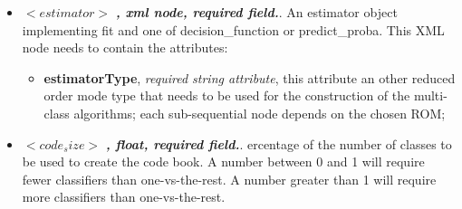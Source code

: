 \begin{itemize}
\item $<estimator>$ \textbf{\textit{, xml node, required field.}}.  An estimator object implementing fit and one of decision\_function or predict\_proba.  This XML node needs to contain the attributes:
\vspace{-5mm}
\begin{itemize}
\itemsep0em
\item \textbf{estimatorType}, \textit{required string attribute}, this attribute an other reduced order mode type that needs to be used for the construction of the multi-class algorithms; each sub-sequential node depends on the chosen ROM;
\end{itemize}
\item $<code_size>$ \textbf{\textit{, float, required field.}}.  ercentage of the number of classes to be used to create the code book. A number between 0 and 1 will require fewer classifiers than one-vs-the-rest. A number greater than 1 will require more classifiers than one-vs-the-rest.
\end{itemize}



